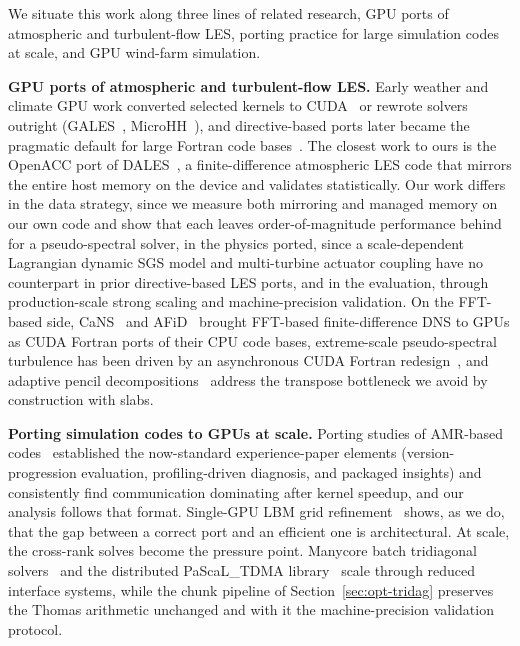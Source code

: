 We situate this work along three lines of related research, GPU ports
of atmospheric and turbulent-flow LES, porting practice for large
simulation codes at scale, and GPU wind-farm simulation.

\textbf{GPU ports of atmospheric and turbulent-flow LES.} Early
weather and climate GPU work converted selected kernels to
CUDA~\cite{michalakes2008,norman2015} or rewrote solvers outright
(GALES~\cite{schalkwijk2012}, MicroHH~\cite{vanheerwaarden2017}), and
directive-based ports later became the pragmatic default for large
Fortran code
bases~\cite{lapillonne2014,giorgetta2022,xia2015,govett2017nim,otero2019nek,devanna2023uranos}.
The closest work to ours is the OpenACC port of
DALES~\cite{esclapez2025dales}, a finite-difference atmospheric LES
code that mirrors the entire host memory on the device and validates
statistically. Our work differs in the data strategy, since we
measure both mirroring and managed memory on our own code and show
that each leaves order-of-magnitude performance behind for a
pseudo-spectral solver, in the physics ported, since a
scale-dependent Lagrangian dynamic SGS model and multi-turbine
actuator coupling have no counterpart in prior directive-based LES
ports, and in the evaluation, through production-scale strong scaling
and machine-precision validation. On the FFT-based side,
CaNS~\cite{costa2018,costa2021} and AFiD~\cite{zhu2018afid} brought
FFT-based finite-difference DNS to GPUs as CUDA Fortran ports of
their CPU code bases, extreme-scale pseudo-spectral turbulence has
been driven by an asynchronous CUDA Fortran
redesign~\cite{ravikumar2019}, and adaptive pencil
decompositions~\cite{romero2022} address the transpose bottleneck we
avoid by construction with slabs.

\textbf{Porting simulation codes to GPUs at scale.} Porting studies of
AMR-based codes~\cite{davis2023crocco,myers2021,katz2020} established
the now-standard experience-paper elements (version-progression
evaluation, profiling-driven diagnosis, and packaged insights) and
consistently find communication dominating after kernel speedup, and
our analysis follows that format. Single-GPU LBM grid
refinement~\cite{mahmoud2024lbm} shows, as we do, that the gap
between a correct port and an efficient one is architectural. At
scale, the cross-rank solves become the pressure point. Manycore
batch tridiagonal solvers~\cite{laszlo2016} and the distributed
PaScaL\_TDMA library~\cite{kim2021pascal} scale through reduced
interface systems, while the chunk pipeline of
Section~\ref{sec:opt-tridag} preserves the Thomas arithmetic
unchanged and with it the machine-precision validation protocol.

